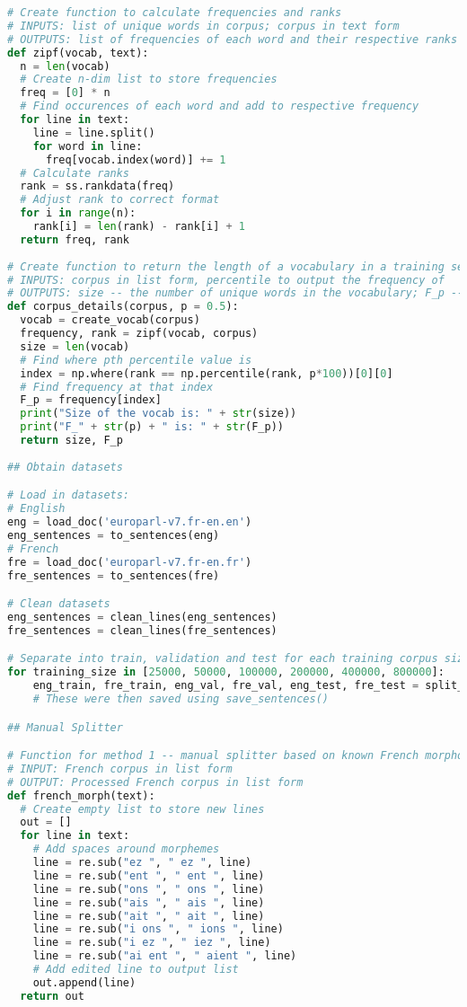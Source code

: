\documentclass[11pt]{article}
\begin{document}
\begin{lstlisting}[language=Python]
# Create function to calculate frequencies and ranks
# INPUTS: list of unique words in corpus; corpus in text form
# OUTPUTS: list of frequencies of each word and their respective ranks (1 being the most frequent)
def zipf(vocab, text):
  n = len(vocab)
  # Create n-dim list to store frequencies
  freq = [0] * n
  # Find occurences of each word and add to respective frequency
  for line in text:
    line = line.split()
    for word in line:
      freq[vocab.index(word)] += 1
  # Calculate ranks
  rank = ss.rankdata(freq)
  # Adjust rank to correct format
  for i in range(n):
    rank[i] = len(rank) - rank[i] + 1
  return freq, rank
  
# Create function to return the length of a vocabulary in a training set and the frequency of the pth percentile word
# INPUTS: corpus in list form, percentile to output the frequency of
# OUTPUTS: size -- the number of unique words in the vocabulary; F_p -- the frequency of the pth percentile word
def corpus_details(corpus, p = 0.5):
  vocab = create_vocab(corpus)
  frequency, rank = zipf(vocab, corpus)
  size = len(vocab)
  # Find where pth percentile value is
  index = np.where(rank == np.percentile(rank, p*100))[0][0]
  # Find frequency at that index
  F_p = frequency[index]
  print("Size of the vocab is: " + str(size))
  print("F_" + str(p) + " is: " + str(F_p))
  return size, F_p
  
## Obtain datasets

# Load in datasets:
# English
eng = load_doc('europarl-v7.fr-en.en')
eng_sentences = to_sentences(eng)
# French
fre = load_doc('europarl-v7.fr-en.fr')
fre_sentences = to_sentences(fre)

# Clean datasets
eng_sentences = clean_lines(eng_sentences)
fre_sentences = clean_lines(fre_sentences)

# Separate into train, validation and test for each training corpus size
for training_size in [25000, 50000, 100000, 200000, 400000, 800000]:
    eng_train, fre_train, eng_val, fre_val, eng_test, fre_test = split_train_val_test(eng_sentences, fre_sentences, training_size, 5000, 2000)
    # These were then saved using save_sentences()

## Manual Splitter

# Function for method 1 -- manual splitter based on known French morphology
# INPUT: French corpus in list form
# OUTPUT: Processed French corpus in list form
def french_morph(text):
  # Create empty list to store new lines
  out = []
  for line in text:
    # Add spaces around morphemes
    line = re.sub("ez ", " ez ", line)
    line = re.sub("ent ", " ent ", line)
    line = re.sub("ons ", " ons ", line)
    line = re.sub("ais ", " ais ", line)
    line = re.sub("ait ", " ait ", line)
    line = re.sub("i ons ", " ions ", line)
    line = re.sub("i ez ", " iez ", line)
    line = re.sub("ai ent ", " aient ", line)
    # Add edited line to output list
    out.append(line)
  return out
  

\end{lstlisting}
\end{document}
